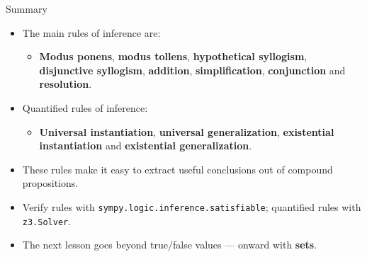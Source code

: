\documentclass[aspectratio=169]{beamer}
\begin{document}
\begin{frame}{Summary}
  \begin{itemize}
    \item The main rules of inference are:
    \begin{itemize}
      \item \textbf{Modus ponens}, \textbf{modus tollens}, \textbf{hypothetical syllogism},
            \textbf{disjunctive syllogism}, \textbf{addition}, \textbf{simplification},
            \textbf{conjunction} and \textbf{resolution}.
    \end{itemize}
    \item Quantified rules of inference:
    \begin{itemize}
      \item \textbf{Universal instantiation}, \textbf{universal generalization},
            \textbf{existential instantiation} and \textbf{existential generalization}.
    \end{itemize}
    \item These rules make it easy to extract useful conclusions out of compound propositions.
    \item Verify rules with \texttt{sympy.logic.inference.satisfiable};
          quantified rules with \texttt{z3.Solver}.
    \item The next lesson goes beyond true/false values --- onward with \textbf{sets}.
  \end{itemize}
\end{frame}
\end{document}
